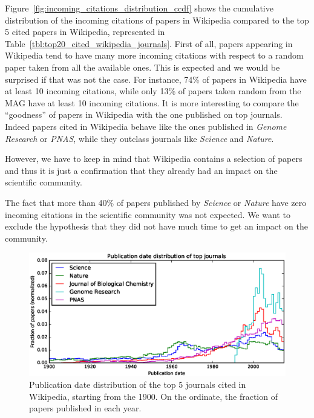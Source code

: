 Figure~\ref{fig:incoming_citations_distribution_ccdf} shows the cumulative distribution of the incoming citations of papers in Wikipedia compared to the top 5 cited papers in Wikipedia, represented in Table~\ref{tbl:top20_cited_wikipedia_journals}.
First of all, papers appearing in Wikipedia tend to have many more incoming citations with respect to a random paper taken from all the available ones.
This is expected and we would be surprised if that was not the case.
For instance, 74\% of papers in Wikipedia have at least 10 incoming citations, while only 13\% of papers taken random from the \ac{MAG} have at least 10 incoming citations.
It is more interesting to compare the ``goodness'' of papers in Wikipedia with the one published on top journals.
Indeed papers cited in Wikipedia behave like the ones published in \emph{Genome Research} or \emph{PNAS}, while they outclass journals like \emph{Science} and \emph{Nature}.

However, we have to keep in mind that Wikipedia contains a selection of papers and thus it is just a confirmation that they already had an impact on the scientific community.

The fact that more than 40\% of papers published by \emph{Science} or \emph{Nature} have zero incoming citations in the scientific community was not expected.
We want to exclude the hypothesis that they did not have much time to get an impact on the community.

\begin{figure}[h]
\centering
\includegraphics[keepaspectratio=true, width=\textwidth]{assets/publication_date_distribution_journals}
\caption{Publication date distribution of the top 5 journals cited in Wikipedia, starting from the 1900.
On the ordinate, the fraction of papers published in each year.}
\label{fig:publication_date_distribution_journals}
\end{figure}

